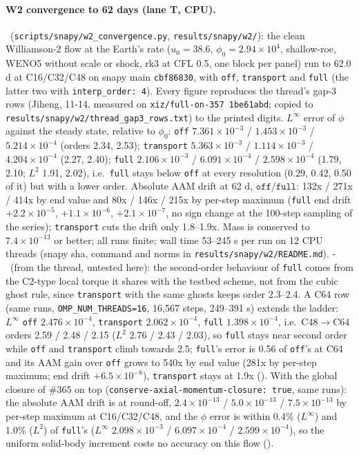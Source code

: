 \paragraph{W2 convergence to 62 days (lane T, CPU).}\measured\ (\texttt{scripts/snapy/w2\_convergence.py},
\texttt{results/snapy/w2/}): the clean Williamson-2 flow at the Earth's rate ($u_0=38.6$, $\phi_0=2.94\times10^4$,
shallow-roe, WENO5 without scale or shock, rk3 at CFL 0.5, one block per panel) run to 62.0 d at C16/C32/C48 on snapy
main \texttt{cbf86830}, with \texttt{off}, \texttt{transport} and \texttt{full} (the latter two with
\texttt{interp\_order: 4}). Every figure reproduces the thread's gap-3 rows (Jiheng, 11-14, measured on
\texttt{xiz/full-on-357 1be61abd}; copied to \texttt{results/snapy/w2/thread\_gap3\_rows.txt}) to the printed digits. $L^\infty$ error of $\phi$ against the steady state,
relative to $\phi_0$: \texttt{off} $7.361\times10^{-3}$ / $1.453\times10^{-3}$ / $5.214\times10^{-4}$ (orders 2.34, 2.53);
\texttt{transport} $5.363\times10^{-3}$ / $1.114\times10^{-3}$ / $4.204\times10^{-4}$ (2.27, 2.40);
\texttt{full} $2.106\times10^{-3}$ / $6.091\times10^{-4}$ / $2.598\times10^{-4}$ (1.79, 2.10; $L^2$ 1.91, 2.02),
i.e.\ \texttt{full} stays below \texttt{off} at every resolution (0.29, 0.42, 0.50 of it) but with a lower order.
Absolute AAM drift at 62 d, $\texttt{off}/\texttt{full}$: 132x / 271x / 414x by end value and 80x / 146x / 215x by
per-step maximum (\texttt{full} end drift $+2.2\times10^{-5}$, $+1.1\times10^{-6}$, $+2.1\times10^{-7}$, no sign
change at the 100-step sampling of the series); \texttt{transport} cuts the drift only 1.8--1.9x. Mass is conserved to $7.4\times10^{-13}$ or better; all
runs finite; wall time 53--245 s per run on 12 CPU threads (snapy sha, command and norms in \texttt{results/snapy/w2/README.md}). \hyp\ (from the thread, untested here): the
second-order behaviour of \texttt{full} comes from the C2-type local torque it shares with the testbed scheme, not
from the cubic ghost rule, since \texttt{transport} with the same ghosts keeps order 2.3--2.4.
A C64 row (same runs, \texttt{OMP\_NUM\_THREADS=16}, 16{,}567 steps, 249--391 s) extends the ladder:
$L^\infty$ \texttt{off} $2.476\times10^{-4}$, \texttt{transport} $2.062\times10^{-4}$, \texttt{full}
$1.398\times10^{-4}$, i.e.\ C48$\to$C64 orders 2.59 / 2.48 / 2.15 ($L^2$ 2.76 / 2.43 / 2.03), so \texttt{full}
stays near second order while \texttt{off} and \texttt{transport} climb towards 2.5; \texttt{full}'s error is 0.56 of
\texttt{off}'s at C64 and its AAM gain over \texttt{off} grows to 540x by end value (281x by per-step maximum;
end drift $+6.5\times10^{-8}$), \texttt{transport} stays at 1.9x (\measured).
With the global closure of \#365 on top (\texttt{conserve-axial-momentum-closure: true}, same runs): the absolute AAM
drift is at round-off, $2.4\times10^{-13}$ / $5.0\times10^{-13}$ / $7.5\times10^{-13}$ by per-step maximum at
C16/C32/C48, and the $\phi$ error is within 0.4\% ($L^\infty$) and 1.0\% ($L^2$) of \texttt{full}'s ($L^\infty$ $2.098\times10^{-3}$ /
$6.097\times10^{-4}$ / $2.599\times10^{-4}$), so the uniform solid-body increment costs no accuracy on this flow
(\measured).
